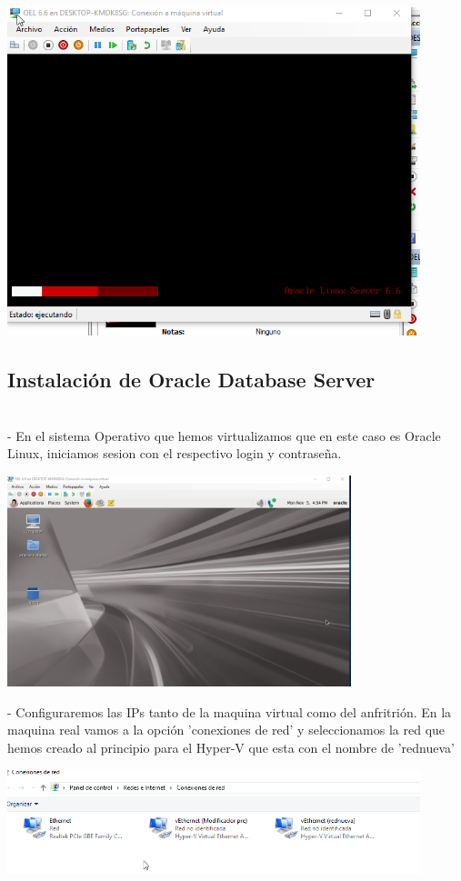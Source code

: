 \documentclass[12pt,letterpaper]{article}
\begin{document}
\begin{center}
	\includegraphics[width=12cm]{./Imagenes/13} 
\end{center}



\begin{itemize}
\subsection{Instalación de Oracle Database Server}\\
- En el sistema Operativo que hemos virtualizamos que en este caso es Oracle Linux, iniciamos sesion con el respectivo login y contraseña.
\end{itemize}

\begin{center}
	\includegraphics[width=10cm]{./Imagenes/14} 
\end{center}


\begin{itemize}
- Configuraremos las IPs tanto de la maquina virtual como del anfritrión. En la maquina real vamos a la opción 'conexiones de red' y seleccionamos la red que hemos creado al principio para el Hyper-V que esta con el nombre de 'rednueva'\\
\end{itemize}

\begin{center}
	\includegraphics[width=12cm]{./Imagenes/15} 
\end{center}
\end{document}
